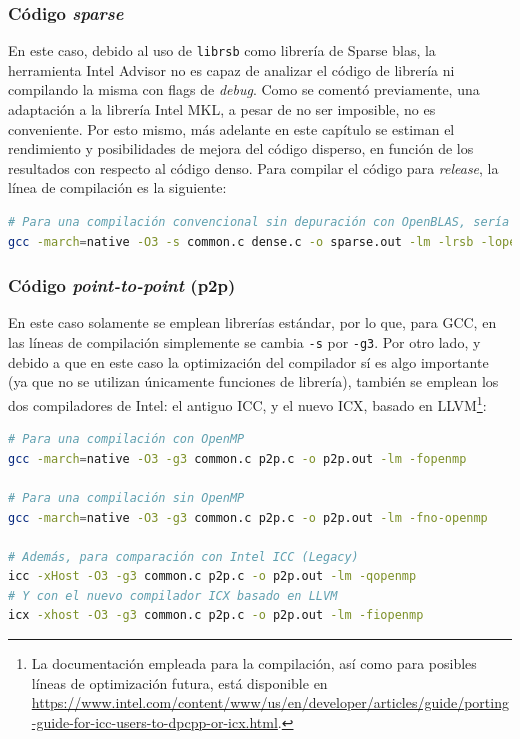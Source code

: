 \subsubsection{Código \textit{sparse}}
En este caso, debido al uso de \texttt{librsb} como librería de Sparse \acrshort{blas}, la herramienta Intel Advisor no es capaz de analizar el código de librería ni compilando la misma con flags de \textit{debug}. Como se comentó previamente, una adaptación a la librería Intel MKL, a pesar de no ser imposible, no es conveniente. Por esto mismo, más adelante en este capítulo se estiman el rendimiento y posibilidades de mejora del código disperso, en función de los resultados con respecto al código denso. Para compilar el código para \textit{release}, la línea de compilación es la siguiente:\medskip
\begin{lstlisting}[language=bash]
# Para una compilación convencional sin depuración con OpenBLAS, sería necesario únicamente compilar con:
gcc -march=native -O3 -s common.c dense.c -o sparse.out -lm -lrsb -lopenblas
\end{lstlisting}

\subsubsection{Código \textit{point-to-point} (p2p)}
En este caso solamente se emplean librerías estándar, por lo que, para GCC, en las líneas de compilación simplemente se cambia \texttt{-s} por \texttt{-g3}. Por otro lado, y debido a que en este caso la optimización del compilador sí es algo importante (ya que no se utilizan únicamente funciones de librería), también se emplean los dos compiladores de Intel: el antiguo ICC, y el nuevo ICX, basado en LLVM\footnote{La documentación empleada para la compilación, así como para posibles líneas de optimización futura, está disponible en \url{https://www.intel.com/content/www/us/en/developer/articles/guide/porting-guide-for-icc-users-to-dpcpp-or-icx.html}.}:\medskip
\begin{lstlisting}[language=bash]
# Para una compilación con OpenMP
gcc -march=native -O3 -g3 common.c p2p.c -o p2p.out -lm -fopenmp

# Para una compilación sin OpenMP
gcc -march=native -O3 -g3 common.c p2p.c -o p2p.out -lm -fno-openmp

# Además, para comparación con Intel ICC (Legacy)
icc -xHost -O3 -g3 common.c p2p.c -o p2p.out -lm -qopenmp
# Y con el nuevo compilador ICX basado en LLVM
icx -xhost -O3 -g3 common.c p2p.c -o p2p.out -lm -fiopenmp
\end{lstlisting}

